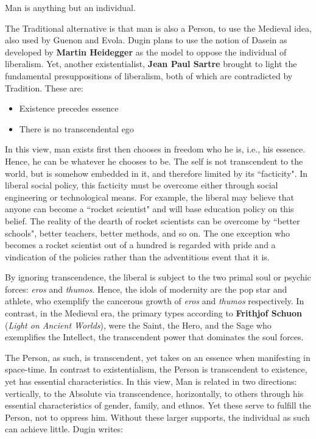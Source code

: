 \begin{quotex}
Man is anything but an individual. 

\end{quotex}
The Traditional alternative is that man is also a Person, to use the Medieval idea, also used by Guenon and Evola. Dugin
plans to use the notion of Dasein as developed by \textbf{Martin Heidegger} as the model to oppose the individual of
liberalism. Yet, another existentialist, \textbf{Jean Paul Sartre} brought to light the fundamental presuppositions of
liberalism, both of which are contradicted by Tradition. These are:

\begin{itemize}
\item Existence precedes essence 
\item There is no transcendental ego 
\end{itemize}
In this view, man exists first then chooses in freedom who he is, i.e., his essence. Hence, he can be whatever he
chooses to be. The self is not transcendent to the world, but is somehow embedded in it, and therefore limited by its
``facticity". In liberal social policy, this facticity must be overcome either through social engineering or
technological means. For example, the liberal may believe that anyone can become a ``rocket scientist" and will base
education policy on this belief. The reality of the dearth of rocket scientists can be overcome by ``better schools",
better teachers, better methods, and so on. The one exception who becomes a rocket scientist out of a hundred is
regarded with pride and a vindication of the policies rather than the adventitious event that it is.

By ignoring transcendence, the liberal is subject to the two primal soul or psychic forces: \emph{eros} and
\emph{thumos}. Hence, the idols of modernity are the pop star and athlete, who exemplify the cancerous growth of
\emph{eros} and \emph{thumos} respectively. In contrast, in the Medieval era, the primary types according to
\textbf{Frithjof Schuon} (\textit{Light on Ancient Worlds}), were the Saint, the Hero, and the Sage who exemplifies the
Intellect, the transcendent power that dominates the soul forces.

The Person, as such, is transcendent, yet takes on an essence when manifesting in space-time. In contrast to
existentialism, the Person is transcendent to existence, yet has essential characteristics. In this view, Man is
related in two directions: vertically, to the Absolute via transcendence, horizontally, to others through his essential
characteristics of gender, family, and ethnos. Yet these serve to fulfill the Person, not to oppress him. Without these
larger supports, the individual as such can achieve little. Dugin writes:

